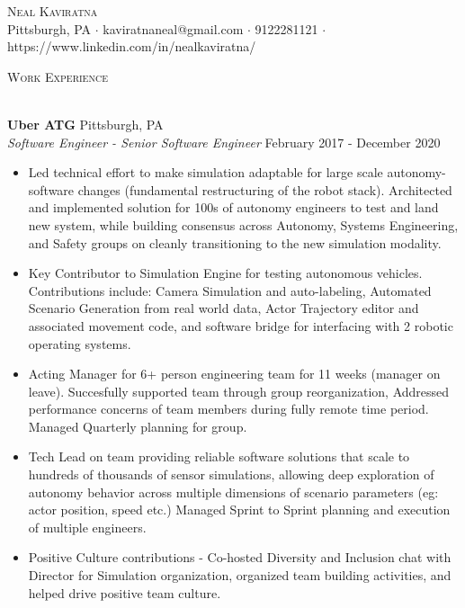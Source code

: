 \documentclass[a4paper]{article}
\newcommand{\lineunder} {
    \vspace*{-8pt} \\
    \hspace*{-18pt} \hrulefill \\
}
\newcommand{\header} [1] {
    {\hspace*{-18pt}\vspace*{6pt} \textsc{#1}}
    \vspace*{-6pt} \lineunder
}
\begin{document}
\vspace*{-40pt}

    

\vspace*{-10pt}
\begin{center}
	{\Huge \scshape {Neal Kaviratna}}\\
	Pittsburgh, PA $\cdot$ kaviratnaneal@gmail.com $\cdot$ 9122281121 $\cdot$ https://www.linkedin.com/in/nealkaviratna/\\
\end{center}

\header{Work Experience}
\vspace{1mm}

\textbf{Uber ATG} \hfill Pittsburgh, PA\\
\textit{Software Engineer - Senior Software Engineer} \hfill February 2017 - December 2020\\
\vspace{-1mm}
\begin{itemize} \itemsep 1pt
	\item Led technical effort to make simulation adaptable for large scale autonomy-software changes (fundamental restructuring of the robot stack). Architected and implemented solution for 100s of autonomy engineers to test and land new system, while building consensus across Autonomy, Systems Engineering, and Safety groups on cleanly transitioning to the new simulation modality.
	\item Key Contributor to Simulation Engine for testing autonomous vehicles. Contributions include: Camera Simulation and auto-labeling, Automated Scenario Generation from real world data, Actor Trajectory editor and associated movement code, and software bridge for interfacing with 2 robotic operating systems.
	\item Acting Manager for 6+ person engineering team for 11 weeks (manager on leave). Succesfully supported team through group reorganization, Addressed performance concerns of team members during fully remote time period. Managed Quarterly planning for group.
	\item Tech Lead on team providing reliable software solutions that scale to hundreds of thousands of sensor simulations, allowing deep exploration of autonomy behavior across multiple dimensions of scenario parameters (eg: actor position, speed etc.) Managed Sprint to Sprint planning and execution of multiple engineers.
	\item Positive Culture contributions - Co-hosted Diversity and Inclusion chat with Director for Simulation organization, organized team building activities, and helped drive positive team culture.
\end{itemize}
\end{document}

